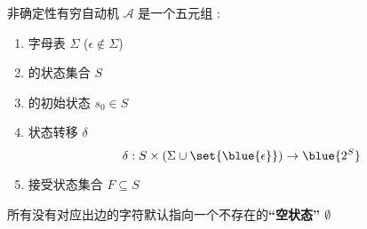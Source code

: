 
\begin{frame}{}
  \begin{definition}
    非确定性有穷自动机 $\mathcal{A}$ 是一个五元组
    :

    \vspace{0.30cm}
    \begin{enumerate}[(1)]
      \item 字母表 $\Sigma$ ($\epsilon \notin \Sigma$)
      \item {}的状态集合 $S$
      \item {}的初始状态 $s_{0} \in S$
      \item 状态转移 $\delta$
        \[
          \delta: S \times (\Sigma \cup \set{\blue{\epsilon}}) \to \blue{2^{S}}
        \]
      \item 接受状态集合 $F \subseteq S$
    \end{enumerate}
  \end{definition}


  \pause
  \begin{center}
     所有没有对应出边的字符默认指向一个不存在的{\bf ``空状态'' $\emptyset$}
  \end{center}
\end{frame}

\begin{frame}{}

\end{frame}

